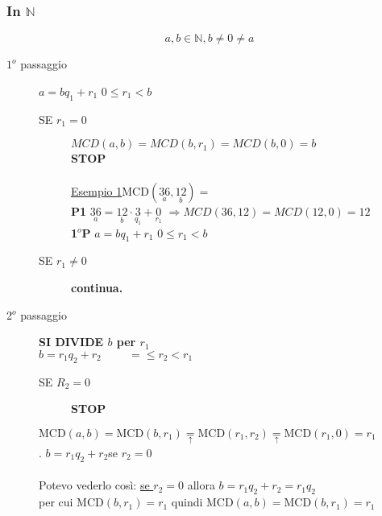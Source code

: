     \subsubsection{In $\mathbb{N}$}
    $$a,b\in\mathbb{N}, b\neq 0\neq a$$
    \begin{description}
        \item[$1^o$ passaggio] $a=bq_1+r_1$\hspace{1cm} $0\leq r_1 < b$\\
        \begin{description}
            \item[SE $r_1=0$] $MCD(a,b)=MCD(b,r_1)=MCD(b,0)=b$\\
                \textbf{STOP}\\\\
                \underline{Esempio 1}\hspace{0.5cm}MCD$(\underset{a}{36},\underset{b}{12})=$\\
                \textbf{P1} $\underset{a}{36}=\underset{b}{12}\cdot\underset{q_1}{3}+\underset{r_1}{0}$
                $\Longrightarrow MCD(36,12)=MCD(12,0)=12$\\
                \textbf{1$^o$P} $a=bq_1+r_1$ \hspace{1cm}$0\leq r_1 < b$
            \item[SE $r_1\neq 0$] \textbf{continua.}

        \end{description}
    \item[2$^o$ passaggio] \textbf{SI DIVIDE $b$ per $r_1$}\\

        $b=r_1q_2+r_2\hspace{1cm}=\leq r_2 < r_1$
            \begin{description}
                \item[SE $R_2=0$]   \textbf{STOP}
            \end{description}
            $\textrm{MCD}(a,b)=\textrm{MCD}(b,r_1)
            \underset{\uparrow}{=}\textrm{MCD}(r_1,r_2)
            \underset{\uparrow}{=}\textrm{MCD}(r_1, 0)=r_1$\\
            .\hspace{2.3cm} $b=r_1q_2+r_2$\hspace{1cm}se $r_2=0$\\\\
            {\color{blue} Potevo vederlo così: \underline{se $r_2=0$} allora $b=r_1q_2+r_2=r_1q_2$\\
            per cui MCD$(b,r_1)=r_1$ quindi MCD$(a,b)=$MCD$(b,r_1)=r_1$}\\


\end{description}
